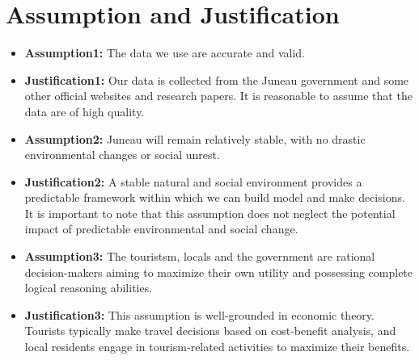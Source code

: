 \documentclass{mcmthesis}
\begin{document}
\section{Assumption and Justification}
\begin{itemize}
  \item \textbf{Assumption1:} The data we use are accurate and valid. 
  \item \textbf{Justification1:} Our data is collected from the Juneau government and some other official websites and research papers. 
  It is reasonable to assume that the data are of high quality.

  \item \textbf{Assumption2:} Juneau will remain relatively stable, with no drastic environmental changes or social unrest.
  \item \textbf{Justification2:} A stable natural and social environment provides a predictable framework within which we can build model and make decisions. 
  It is important to note that this assumption does not neglect the potential impact of predictable environmental and social change.
  
  \item \textbf{Assumption3:} The touristsm, locals and the government are rational decision-makers aiming to maximize their own utility and possessing complete logical reasoning abilities.%
  \item \textbf{Justification3:} This assumption is well-grounded in economic theory. Tourists typically make travel decisions based on cost-benefit analysis\cite{crouch2004determinants}, 
  and local residents engage in tourism-related activities to maximize their benefits\cite{ap1992residents}.
\end{itemize}
\end{document}

